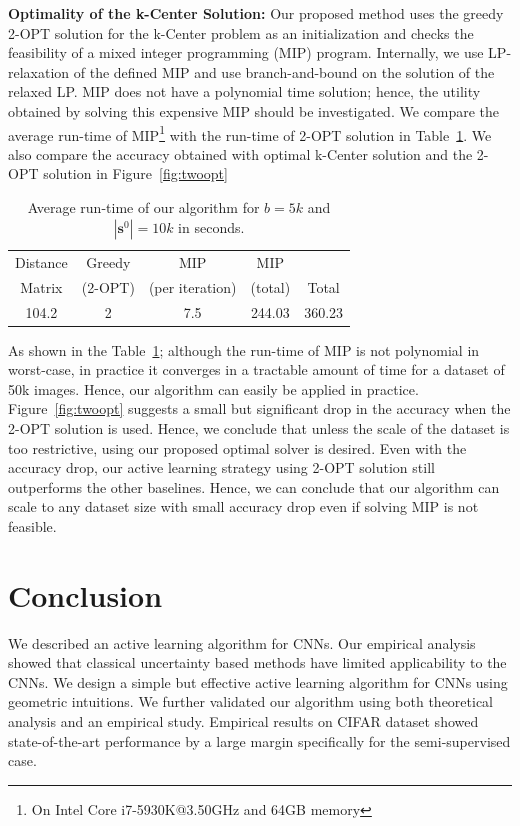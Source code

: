 \documentclass{article}
\begin{document}
\noindent\textbf{Optimality of the k-Center Solution:} Our proposed method uses the greedy 2-OPT solution for the k-Center problem as an initialization and checks the feasibility of a mixed integer programming (MIP) program. Internally, we use LP-relaxation of the defined MIP and use branch-and-bound on the solution of the relaxed LP. MIP does not have a polynomial time solution; hence, the utility obtained by solving this expensive MIP should be investigated. We compare the average run-time of MIP\footnote{On Intel Core i7-5930K@3.50GHz and 64GB memory} with the run-time of 2-OPT solution in Table~\ref{tab:runtime}. We also compare the accuracy obtained with optimal k-Center solution and the 2-OPT solution in Figure~\ref{fig:twoopt}


\begin{table}[ht]
\centering
\vspace{-3mm}
\caption{Average run-time of our algorithm for $b=5k$ and $|\mathbf{s}^0|=10k$ in seconds.}
\begin{tabular}{ccccc} \toprule
 Distance& Greedy & MIP & MIP &  \\
Matrix &(2-OPT) & (per iteration) & (total) & Total \\ \midrule
104.2  & 2   & 7.5  &  244.03  & 360.23  \\ \bottomrule
\end{tabular}
\label{tab:runtime}
\vspace{-2mm}
\end{table}

As shown in the Table~\ref{tab:runtime}; although the run-time of MIP is not polynomial in worst-case, in practice it converges in a tractable amount of time for a dataset of 50k images. Hence, our algorithm can easily be applied in practice. Figure~\ref{fig:twoopt} suggests a small but significant drop in the accuracy when the 2-OPT solution is used. Hence, we conclude that unless the scale of the dataset is too restrictive, using our proposed optimal solver is desired. Even with the accuracy drop, our active learning strategy using 2-OPT solution still outperforms the other baselines. Hence, we can conclude that our algorithm can scale to any dataset size with small accuracy drop even if solving MIP is not feasible.

\section{Conclusion}
We described an active learning algorithm for CNNs. Our empirical analysis showed that classical uncertainty based methods have limited applicability to the CNNs. We design a simple but effective active learning algorithm for CNNs using geometric intuitions. We further validated our algorithm using both theoretical analysis and an empirical study. Empirical results on CIFAR\cite{cifar} dataset showed state-of-the-art performance by a large margin specifically for the semi-supervised case.
\end{document}

